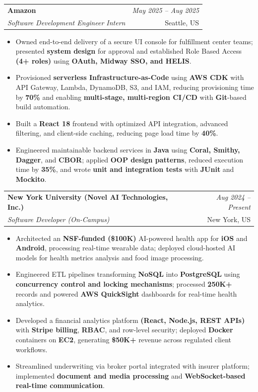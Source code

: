 \documentclass[a4paper,10pt]{article}
\makeatletter
\newcommand{\resumeSubheading}[4]{
\vspace{0.3mm}\item
    \begin{tabular*}{0.98\textwidth}[t]{l@{\extracolsep{\fill}}r}
        \textbf{#1} & \textit{\footnotesize{#4}} \\
        \textit{\footnotesize{#3}} & \footnotesize{#2}\\
    \end{tabular*}\vspace{-2mm}
}
\newcommand{\resumeItemListStart}{\begin{itemize}[leftmargin=*, labelsep=1mm, itemsep=0pt]}
\newcommand{\resumeItemListEnd}{\end{itemize}\vspace{-2mm}}
\makeatother
\begin{document}
\resumeSubheading
{Amazon}{Seattle, US}
{Software Development Engineer Intern}{May 2025 -- Aug 2025}
\resumeItemListStart
\item \footnotesize{Owned end-to-end delivery of a secure UI console for fulfillment center teams; presented \textbf{system design} for approval and established Role Based Access \textbf{(4+ roles)} using \textbf{OAuth, Midway SSO, and HELIS}.}
\item \footnotesize{Provisioned \textbf{serverless Infrastructure-as-Code} using \textbf{AWS CDK} with API Gateway, Lambda, DynamoDB, S3, and IAM, reducing provisioning time by \textbf{70\%} and enabling \textbf{multi-stage, multi-region CI/CD} with \textbf{Git}-based build automation.}
\item \footnotesize{Built a \textbf{React 18} frontend with optimized API integration, advanced filtering, and client-side caching, reducing page load time by \textbf{40\%}.}
\item \footnotesize{Engineered maintainable backend services in \textbf{Java} using \textbf{Coral, Smithy, Dagger}, and \textbf{CBOR}; applied \textbf{OOP design patterns}, reduced execution time by \textbf{35\%}, and wrote \textbf{unit and integration tests} with \textbf{JUnit} and \textbf{Mockito}.}
\resumeItemListEnd

\resumeSubheading
{New York University (Novel AI Technologies, Inc.)}{New York, US}
{Software Developer (On-Campus)}{Aug 2024 -- Present}
\resumeItemListStart
\item \footnotesize{Architected an \textbf{NSF-funded (\$100K)} AI-powered health app for \textbf{iOS} and \textbf{Android}, processing real-time wearable data; deployed cloud-hosted AI models for health metrics analysis and food image processing.}
\item \footnotesize{Engineered ETL pipelines transforming \textbf{NoSQL} into \textbf{PostgreSQL} using \textbf{concurrency control and locking mechanisms}; processed \textbf{250K+} records and powered \textbf{AWS QuickSight} dashboards for real-time health analytics.}
\item \footnotesize{Developed a financial analytics platform \textbf{(React, Node.js, REST APIs)} with \textbf{Stripe billing}, \textbf{RBAC}, and row-level security; deployed \textbf{Docker} containers on \textbf{EC2}, generating \textbf{\$50K+} revenue across regulated client workflows.}
\item \footnotesize{Streamlined underwriting via broker portal integrated with insurer platform; implemented \textbf{document and media processing} and \textbf{WebSocket-based real-time communication}.}
\resumeItemListEnd
\end{document}
